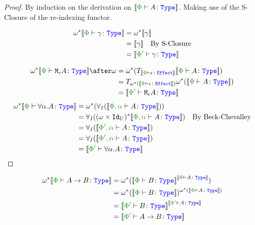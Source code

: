 \documentclass{report}
\begin{document}
\begin{framed}
    \begin{proof}
            By induction on the derivation on $\deno{\typerelation{\P}{A}{\type}}$. Making use of the S-Closure of the re-indexing functor.
            
            \begin{align*}
                \w\star\deno{\typerelation{\P}{\g}{\type}} &= \w\star\deno{\g}\\
                & =  \deno{\g}\qt{By S-Closure}\\
                & = \deno{\typerelation{\P'}{\g}{\type}}
            \end{align*}
            
            \begin{align*}
                \w\star\deno{\typerelation{\P}{\mea}{\type}}\after\w & =  \w\star(\T{\deno{\typerelation{\P}{\e}{\effect}}}{\deno{\typerelation{\P}{A}{\type}}})\\
                &= \T{\w\star(\deno{\typerelation{\P}{\e}{\effect}})}{\w\star(\deno{\typerelation{\P}{A}{\type}})}\\
                & = \deno{\typerelation{\P'}{\mea}{\type}}
            \end{align*}
                \begin{align*}
                    \w\star\deno{\typerelation{\P}{\all{\a}A}{\type}} & = \w\star(\allI(\deno{\typerelation{\P,\a}{A}{\type}}))\\
                    & = \allI((\w\times\Id{U})\star\deno{\typerelation{\P,\a}{A}{\type}})\qt{By Beck-Chevalley}\\
                    & = \allI(\deno{\typerelation{\P',\a}{A}{\type}})\\
                    & = \allI(\deno{\typerelation{\P',\a}{A}{\type}})\\
                    & = \deno{\typerelation{\P'}{\all{\a}{A}}{\type}}\\
                \end{align*}
    \end{proof}
        
\end{framed}
    \begin{align*}
        \w\star\deno{\typerelation{\P}{\ab}{\type}} &= \w\star(\deno{\typerelation{\P}{B}{\type}}^{\deno{\typerelation{\P}{A}{\type}}})\\
        &=\w\star(\deno{\typerelation{\P}{B}{\type}})^{\w\star(\deno{\typerelation{\P}{A}{\type}})}\\
        & = \deno{\typerelation{\P'}{B}{\type}}^{\deno{\typerelation{\P'}{A}{\type}}}\\
        & = \deno{\typerelation{\P'}{\ab}{\type}}\\
    \end{align*}
\end{document}
